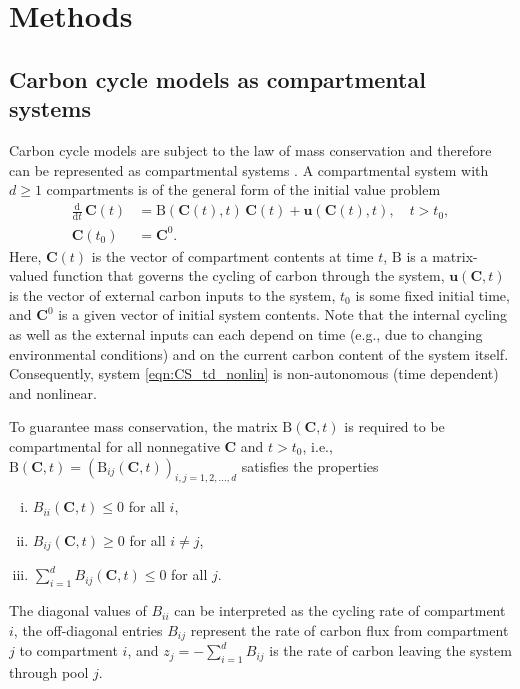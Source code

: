 \documentclass[draft]{agujournal2019}
\renewcommand{\vec}[1]{\mathbf{#1}}
\newcommand{\tens}[1]{\mathrm{#1}}
\newcommand{\deriv}[1]{\frac{\mathrm{d}}{\mathrm{d}#1}}
\newcommand{\suml}{\sum\limits}
\begin{document}
\section{Methods}
\subsection{Carbon cycle models as compartmental systems}
Carbon cycle models are subject to the law of mass conservation and therefore can be represented as compartmental systems \cite{Anderson1983, Jacquez1993}. A compartmental system with $d\geq1$ compartments is of the general form of the initial value problem
    \begin{equation}\label{eqn:CS_td_nonlin}
        \begin{aligned}
            \deriv{t}\,\vec{C}(t) &= \tens{B}(\vec{C}(t),t)\,\vec{C}(t) + \vec{u}(\vec{C}(t),t),\quad t>t_0,\\
            \vec{C}(t_0) &= \vec{C}^0.
        \end{aligned}
    \end{equation}Here, $\vec{C}(t)$ is the vector of compartment contents at time $t$, $\tens{B}$ is a matrix-valued function that governs the cycling of carbon through the system, $\vec{u}(\vec{C},t)$ is the vector of external carbon inputs to the system, $t_0$ is some fixed initial time, and $\vec{C}^0$ is a given vector  of initial system contents. Note that the internal cycling as well as the external inputs can each depend on time (e.g., due to changing environmental conditions) and on the current carbon content of the system itself. Consequently, system \eqref{eqn:CS_td_nonlin} is non-autonomous (time dependent) and nonlinear.
    
To guarantee mass conservation, the matrix $\tens{B}(\vec{C},t)$ is required to be compartmental 
for all nonnegative $\vec{C}$ and $t>t_0$, i.e., $\tens{B}(\vec{C},t)=(\tens{B}_{ij}(\vec{C},t))_{i,j=1,2,\ldots,d}$ satisfies the properties
    \begin{enumerate}[(i)]
        \item $B_{ii}(\vec{C},t)\leq0$ for all $i$,
        \item $B_{ij}(\vec{C},t)\geq0$ for all $i\neq j$,
        \item $\suml_{i=1}^d B_{ij}(\vec{C},t)\leq0$ for all $j$.
    \end{enumerate}
The diagonal values of $B_{ii}$ can be interpreted as the cycling rate of compartment $i$, the off-diagonal entries $B_{ij}$ represent the rate of carbon flux from compartment $j$ to compartment $i$, and $z_j=-\sum_{i=1}^d B_{ij}$ is the rate of carbon leaving the system through pool $j$.
    
\end{document}
